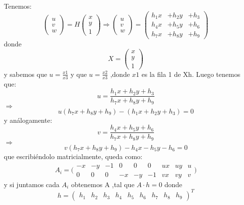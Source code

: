 Tenemos:
\[\begin{pmatrix} u\\ v\\ w \end{pmatrix}=H\begin{pmatrix} x\\ y\\ 1 \end{pmatrix}\Rightarrow \begin{pmatrix} u\\ v\\ w \end{pmatrix}=\begin{pmatrix} h_{1}x& +h_{2}y &+h_{3} \\ h_{4}x& +h_{5}y &+h_{6} \\ h_{7}x& +h_{8}y & +h_{9} \end{pmatrix}\]
donde \[ X=\begin{pmatrix} x\\ y\\ 1 \end{pmatrix} \] y sabemos que $u=\frac{x1}{x3}$ y que $u=\frac{x2}{x3}$ ,donde $x1$ es la fila 1 de Xh. Luego tenemos que:
\[u=\frac{h_{1}x+h_{2}y+h_{3}}{h_{7}x+h_{8}y+h_{9}}\]
$\Rightarrow$ \[u(h_{7}x+h_{8}y+h_{9})-(h_{1}x+h_{2}y+h_{3})=0\]
y análogamente:
\[v=\frac{h_{4}x+h_{5}y+h_{6}}{h_{7}x+h_{8}y+h_{9}}\]
$\Rightarrow$ \[v(h_{7}x+h_{8}y+h_{9})-h_{4}x-h_{5}y-h_{6}=0\]
que escribiéndolo matricialmente, queda como:
\[A_{i}=\bigl(\begin{smallmatrix} -x&-y &-1 &0 &0 &0 &ux &uy &u \\ 0& 0& 0&-x &-y &-1 &vx &vy &v \end{smallmatrix}\bigr)\]
y si juntamos cada $A_{i}$ obtenemos A ,tal que $ A \cdot h=0$ donde \[h=\begin{pmatrix} h_{1} &h_{2} & h_{3} &h_{4} &h_{5} &h_{6} &h_{7} &h_{8} &h_{9} \end{pmatrix}^{T}\]

